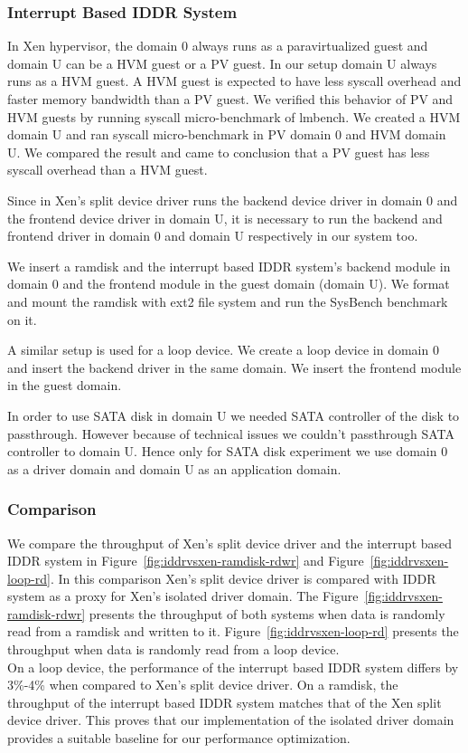 \subsubsection*{Interrupt Based IDDR System}
In Xen hypervisor, the domain 0 always runs as a paravirtualized guest and domain U can be a HVM guest or a PV guest. In our setup domain U always runs as a HVM guest. A HVM guest is expected to have less syscall overhead and faster memory bandwidth than a PV guest. We verified this behavior of PV and HVM guests by running syscall micro-benchmark of lmbench. We created a HVM domain U and ran syscall micro-benchmark in PV domain 0 and HVM domain U. We compared the result and came to conclusion that a PV guest has less syscall overhead than a HVM guest.

Since in Xen's split device driver runs the backend device driver in domain 0 and the frontend device driver in domain U, it is necessary to run the backend and frontend driver in domain 0 and domain U respectively in our system too.

We insert a ramdisk and the interrupt based IDDR system's backend module in domain 0 and the frontend module in the guest domain (domain U). We format and mount the ramdisk with ext2 file system and run the SysBench benchmark on it.  

A similar setup is used for a loop device. We create a loop device in domain 0 and insert the backend driver in the same domain. We insert the frontend module in the guest domain.

In order to use SATA disk in domain U we needed SATA controller of the disk to passthrough. However because of technical issues we couldn't passthrough SATA controller to domain U. Hence only for SATA disk experiment we use domain 0 as a driver domain and domain U as an application domain.

\subsubsection*{Comparison }
We compare the throughput of Xen's split device driver and the interrupt based IDDR system in Figure~\ref{fig:iddrvsxen-ramdisk-rdwr} and Figure~\ref{fig:iddrvsxen-loop-rd}. In this comparison Xen's split device driver is compared with IDDR system as a proxy for Xen's isolated driver domain. The Figure~\ref{fig:iddrvsxen-ramdisk-rdwr} presents the throughput of both systems when data is randomly read from a ramdisk and written to it. Figure~\ref{fig:iddrvsxen-loop-rd} presents the throughput when data is randomly read from a loop device. 
\\[3mm]
On a loop device, the performance of the interrupt based IDDR system differs by 3\%-4\% when compared to Xen's split device driver. On a ramdisk, the throughput of the interrupt based IDDR system matches that of the Xen split device driver. This proves that our implementation of the isolated driver domain provides a suitable baseline for our performance optimization.

